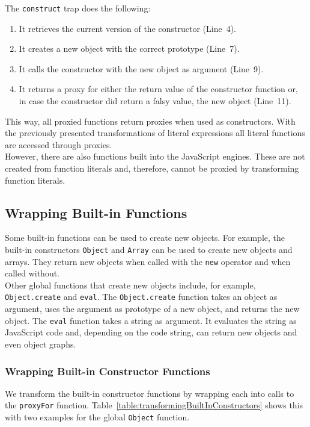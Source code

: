 The \lstinline{construct} trap does the following:
\begin{enumerate}
    \item It retrieves the current version of the constructor (Line~4).
    \item It creates a new object with the correct prototype (Line~7).
    \item It calls the constructor with the new object as argument (Line~9).
    \item It returns a proxy for either the return value of the constructor function or, in case the constructor did return a falsy value, the new object (Line~11).
\end{enumerate}

This way, all proxied functions return proxies when used as constructors.
With the previously presented transformations of literal expressions all literal functions are accessed through proxies.\\
However, there are also functions built into the JavaScript engines.
These are not created from function literals and, therefore, cannot be proxied by transforming function literals.


\subsection{Wrapping Built-in Functions}

Some built-in functions can be used to create new objects.
For example, the built-in constructors \lstinline{Object} and \lstinline{Array} can be used to create new objects and arrays.
They return new objects when called with the \lstinline{new} operator and when called without.\\
Other global functions that create new objects include, for example, \lstinline{Object.create} and \lstinline{eval}.
The \lstinline{Object.create} function takes an object as argument, uses the argument as prototype of a new object, and returns the new object.
The \lstinline{eval} function takes a string as argument.
It evaluates the string as JavaScript code and, depending on the code string, can return new objects and even object graphs.


\subsubsection{Wrapping Built-in Constructor Functions}

We transform the built-in constructor functions by wrapping each into calls to the \lstinline{proxyFor} function.
Table~\ref{table:transformingBuiltInConstructors} shows this with two examples for the global \lstinline{Object} function.

